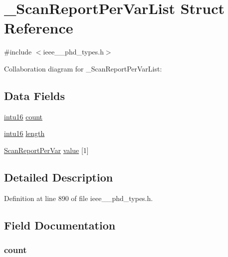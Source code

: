 \hypertarget{struct___scan_report_per_var_list}{}\section{\+\_\+\+Scan\+Report\+Per\+Var\+List Struct Reference}
\label{struct___scan_report_per_var_list}


{\ttfamily \#include $<$ieee\+\_\+\_\+phd\+\_\+types.\+h$>$}



Collaboration diagram for \+\_\+\+Scan\+Report\+Per\+Var\+List\+:
\subsection*{Data Fields}
\begin{DoxyCompactItemize}
\item 
\hyperlink{ieee__11073__phd__types_8h_a3561595d2aa7416532e1c9910abd076d}{intu16} \hyperlink{struct___scan_report_per_var_list_abf6db060ae8e224764b0f867fb135ecd}{count}
\item 
\hyperlink{ieee__11073__phd__types_8h_a3561595d2aa7416532e1c9910abd076d}{intu16} \hyperlink{struct___scan_report_per_var_list_a3743679e4ff85e3e1b3fc2e59973fbb3}{length}
\item 
\hyperlink{ieee__11073__phd__types_8h_abbcaf93ae3b34f947a8d6c68b922b805}{Scan\+Report\+Per\+Var} \hyperlink{struct___scan_report_per_var_list_a0e30978c2fa4bb6a8fb5053b65b7a421}{value} \mbox{[}1\mbox{]}
\end{DoxyCompactItemize}


\subsection{Detailed Description}


Definition at line 890 of file ieee\+\_\+\_\+phd\+\_\+types.\+h.



\subsection{Field Documentation}
\hypertarget{struct___scan_report_per_var_list_abf6db060ae8e224764b0f867fb135ecd}{}
\subsubsection[{count}]{ count}\label{struct___scan_report_per_var_list_abf6db060ae8e224764b0f867fb135ecd}


